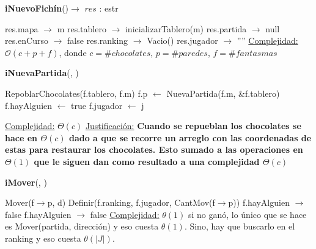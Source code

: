 \documentclass[10pt,a4paper]{article}
\begin{document}
\begin{Algoritmos}

    \begin{algorithm}[H]{\textbf{iNuevoFichín}()$\to$ $res$ : estr}
        \begin{algorithmic}
            \State res.mapa $\to$ m
            \State res.tablero $\to$ inicializarTablero(m) 
            \State res.partida $\to$ null
            \State res.enCurso $\to$ false
            \State res.ranking $\to$ Vacio()
            \State res.jugador $\to$ ''''
            \Statex \underline{Complejidad:} $\mathcal{O}(c + p + f)$, donde $c = \#chocolates$, $p = \#paredes$, $f = \#fantasmas$
        \end{algorithmic}
    \end{algorithm}

    \begin{algorithm}[H]{\textbf{iNuevaPartida}(, )}
        \begin{algorithmic}
        
            \State RepoblarChocolates(f.tablero, f.m)
            \State f.p $\leftarrow$ NuevaPartida(f.m, &f.tablero)
            \State f.hayAlguien $\leftarrow$ true
            \State f.jugador $\leftarrow$ j
        
            \Statex \underline{Complejidad:} $\Theta(c)$
            \Statex \underline{Justificación:} \textbf{Cuando se repueblan los chocolates se hace en $\Theta(c)$ dado a que se recorre un arreglo con las coordenadas de estas para restaurar los chocolates.
		Esto sumado a las operaciones en $\Theta(1)$ que le siguen dan como resultado a una complejidad $\Theta(c)$}
        \end{algorithmic}
    \end{algorithm}

    \begin{algorithm}[H]{\textbf{iMover}(, })
        \begin{algorithmic}
            \State Mover(f$\to$p, d)
                \State Definir(f.ranking, f.jugador, CantMov(f$\to$p))
                \State f.hayAlguien $\to$ false
            \Else
                    \State f.hayAlguien $\to$ false
                \EndIf
            \EndIf
            \State \underline{Complejidad:} $\theta(1)$ si no ganó, lo único que se hace es Mover(partida, dirección) y eso cuesta $\theta(1)$. Sino, hay que buscarlo en el ranking y eso cuesta $\theta(|J|)$.
        \end{algorithmic}
        

\end{algorithm}
\end{Algoritmos}
\end{document}

